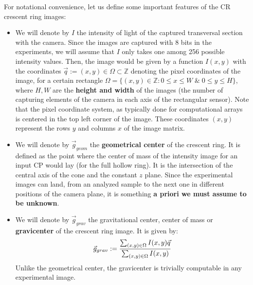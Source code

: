\documentclass[11pt, a4paper, twoside]{article} %
\begin{document}
For notational convenience, let us define some important features of the CR crescent ring images:\vspace{-0.15cm}
\begin{itemize}
\item We will denote by $I$ the intensity of light of the captured transversal section with the camera. Since the images are captured with 8 bits in the experiments, we will assume that $I$ only takes one among 256 possible intensity values. Then, the image would be given by a function $I(x,y)$ with the coordinates $\vec{q}:=(x,y)\in\Omega\subset \mathbb{Z}$ denoting the pixel coordinates of the image, for a certain rectangle $\Omega=\{(x,y)\in\mathbb{Z}:0\leq x\leq W\;\&\;0\leq y\leq H\}$, where $H,W$ are the {\bf height and width} of the images (the number of capturing elements of the camera in each axis of the rectangular sensor). Note that the pixel coordinate system, as typically done for computational arrays is centered in the top left corner of the image. These coordinates $(x,y)$ represent the rows $y$ and columns $x$ of the image matrix.


\item We will denote by $\vec{g}_{geom}$ the {\bf geometrical center} of the crescent ring. It is defined as the point where the center of mass of the intensity image for an input CP would lay (for the full hollow ring). It is the intersection of the central axis of the cone and the constant $z$ plane. Since the experimental images can land, from an analyzed sample to the next one in different positions of the camera plane, it is something {\bf a priori we must assume to be unknown}.

\item We will denote by $\vec{g}_{grav}$ the gravitational center, center of mass or {\bf gravicenter} of the crescent ring image. It is given by:\vspace{-0.05cm}
\begin{equation}\label{grav}
\vec{g}_{grav}:=\frac{\sum_{(x,y)\in\Omega} I(x,y)\vec{q}}{\sum_{(x,y)\in\Omega}I(x,y)}\vspace{0.05cm}
\end{equation}
Unlike the geometrical center, the gravicenter is trivially computable in any experimental image.


\end{itemize}
\end{document}
